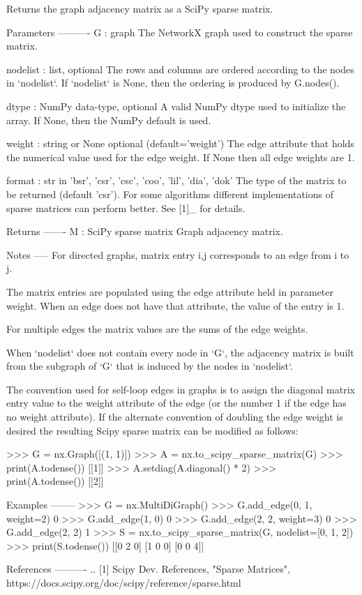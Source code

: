 \begin{DoxyVerb}Returns the graph adjacency matrix as a SciPy sparse matrix.

Parameters
----------
G : graph
    The NetworkX graph used to construct the sparse matrix.

nodelist : list, optional
   The rows and columns are ordered according to the nodes in `nodelist`.
   If `nodelist` is None, then the ordering is produced by G.nodes().

dtype : NumPy data-type, optional
    A valid NumPy dtype used to initialize the array. If None, then the
    NumPy default is used.

weight : string or None   optional (default='weight')
    The edge attribute that holds the numerical value used for
    the edge weight.  If None then all edge weights are 1.

format : str in {'bsr', 'csr', 'csc', 'coo', 'lil', 'dia', 'dok'}
    The type of the matrix to be returned (default 'csr').  For
    some algorithms different implementations of sparse matrices
    can perform better.  See [1]_ for details.

Returns
-------
M : SciPy sparse matrix
   Graph adjacency matrix.

Notes
-----
For directed graphs, matrix entry i,j corresponds to an edge from i to j.

The matrix entries are populated using the edge attribute held in
parameter weight. When an edge does not have that attribute, the
value of the entry is 1.

For multiple edges the matrix values are the sums of the edge weights.

When `nodelist` does not contain every node in `G`, the adjacency matrix
is built from the subgraph of `G` that is induced by the nodes in
`nodelist`.

The convention used for self-loop edges in graphs is to assign the
diagonal matrix entry value to the weight attribute of the edge
(or the number 1 if the edge has no weight attribute).  If the
alternate convention of doubling the edge weight is desired the
resulting Scipy sparse matrix can be modified as follows:

>>> G = nx.Graph([(1, 1)])
>>> A = nx.to_scipy_sparse_matrix(G)
>>> print(A.todense())
[[1]]
>>> A.setdiag(A.diagonal() * 2)
>>> print(A.todense())
[[2]]

Examples
--------
>>> G = nx.MultiDiGraph()
>>> G.add_edge(0, 1, weight=2)
0
>>> G.add_edge(1, 0)
0
>>> G.add_edge(2, 2, weight=3)
0
>>> G.add_edge(2, 2)
1
>>> S = nx.to_scipy_sparse_matrix(G, nodelist=[0, 1, 2])
>>> print(S.todense())
[[0 2 0]
 [1 0 0]
 [0 0 4]]

References
----------
.. [1] Scipy Dev. References, "Sparse Matrices",
   https://docs.scipy.org/doc/scipy/reference/sparse.html
\end{DoxyVerb}
 